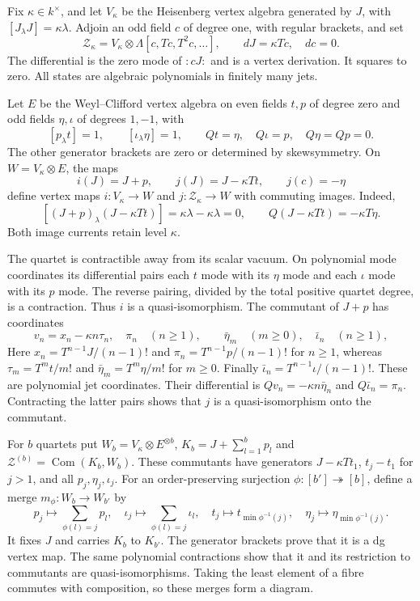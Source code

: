 Fix $\kappa\in k^\times$, and let $V_\kappa$ be the
Heisenberg vertex algebra generated by $J$, with
$[J_\lambda J]=\kappa\lambda$. Adjoin an odd field $c$
of degree one, with regular brackets, and set
\[
 \mathcal Z_\kappa=V_\kappa\otimes\Lambda[c,Tc,T^2c,\ldots],
 \qquad dJ=\kappa Tc,\quad dc=0.
\]
The differential is the zero mode of ${:}cJ{:}$ and is a
vertex derivation. It squares to zero. All states are
algebraic polynomials in finitely many jets.

Let $E$ be the Weyl--Clifford vertex algebra on even fields
$t,p$ of degree zero and odd fields $\eta,\iota$ of degrees
$1,-1$, with
\begin{equation}\label{cycen:eq:quartet}
 [p_\lambda t]=1,\qquad [\iota_\lambda\eta]=1,\qquad
 Qt=\eta,\quad Q\iota=p,\quad Q\eta=Qp=0.
\end{equation}
The other generator brackets are zero or determined by
skewsymmetry. On $W=V_\kappa\otimes E$, the maps
\begin{equation}\label{cycen:eq:quartet-maps}
 i(J)=J+p,\qquad j(J)=J-\kappa Tt,\qquad j(c)=-\eta
\end{equation}
define vertex maps $i:V_\kappa\to W$ and
$j:\mathcal Z_\kappa\to W$ with commuting images.
Indeed,
\[
 [(J+p)_\lambda(J-\kappa Tt)]=\kappa\lambda-\kappa\lambda=0,
 \qquad Q(J-\kappa Tt)=-\kappa T\eta.
\]
Both image currents retain level $\kappa$.

The quartet is contractible away from its scalar vacuum.
On polynomial mode coordinates its differential pairs each
$t$ mode with its $\eta$ mode and each $\iota$ mode with
its $p$ mode. The reverse pairing, divided by the total
positive quartet degree, is a contraction. Thus $i$ is a
quasi-isomorphism. The commutant of $J+p$ has coordinates
\[
 v_n=x_n-\kappa n\tau_n,\quad \pi_n\quad(n\geq1),
 \qquad \bar\eta_m\quad(m\geq0),\quad\bar\iota_n\quad(n\geq1),
\]
Here $x_n=T^{n-1}J/(n-1)!$ and
$\pi_n=T^{n-1}p/(n-1)!$ for $n\geq1$,
whereas $\tau_m=T^mt/m!$ and
$\bar\eta_m=T^m\eta/m!$ for $m\geq0$.
Finally $\bar\iota_n=T^{n-1}\iota/(n-1)!$.
These are polynomial jet coordinates. Their differential is
$Qv_n=-\kappa n\bar\eta_n$ and $Q\bar\iota_n=\pi_n$.
Contracting the latter pairs shows that $j$ is a
quasi-isomorphism onto the commutant.

For $b$ quartets put $W_b=V_\kappa\otimes E^{\otimes b}$,
$K_b=J+\sum_{l=1}^bp_l$ and
$\mathcal Z^{(b)}=\operatorname{Com}(K_b,W_b)$.
These commutants have generators
$J-\kappa Tt_1$, $t_j-t_1$ for $j>1$, and all
$p_j,\eta_j,\iota_j$. For an order-preserving surjection
$\phi:[b']\twoheadrightarrow[b]$, define a merge
$m_\phi:W_b\to W_{b'}$ by
\[
 p_j\mapsto\sum_{\phi(l)=j}p_l,\quad
 \iota_j\mapsto\sum_{\phi(l)=j}\iota_l,\quad
 t_j\mapsto t_{\min\phi^{-1}(j)},\quad
 \eta_j\mapsto\eta_{\min\phi^{-1}(j)}.
\]
It fixes $J$ and carries $K_b$ to $K_{b'}$. The generator
brackets prove that it is a dg vertex map. The same polynomial
contractions show that it and its restriction to commutants
are quasi-isomorphisms. Taking the least element of a fibre
commutes with composition, so these merges form a diagram.

